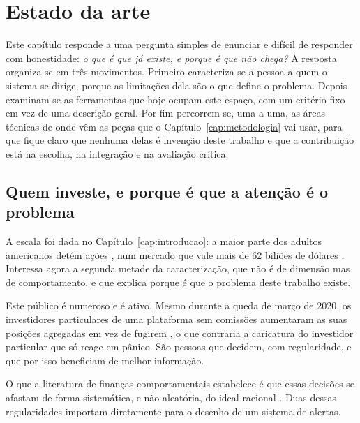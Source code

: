 
\chapter{Estado da arte}
\label{cap:contexto}

Este capítulo responde a uma pergunta simples de enunciar e difícil de responder com honestidade:
\emph{o que é que já existe, e porque é que não chega?} A resposta organiza-se em três movimentos.
Primeiro caracteriza-se a pessoa a quem o sistema se dirige, porque as limitações dela são o que
define o problema. Depois examinam-se as ferramentas que hoje ocupam este espaço, com um critério
fixo em vez de uma descrição geral. Por fim percorrem-se, uma a uma, as áreas técnicas de onde vêm
as peças que o Capítulo~\ref{cap:metodologia} vai usar, para que fique claro que nenhuma delas é
invenção deste trabalho e que a contribuição está na escolha, na integração e na avaliação crítica.

\section{Quem investe, e porque é que a atenção é o problema}
\label{sec:ctx_investidor}

A escala foi dada no Capítulo~\ref{cap:introducao}: a maior parte dos adultos americanos detém
ações \autocite{gallup2025stock}, num mercado que vale mais de 62 biliões de dólares
\autocite{sifma2025factbook}. Interessa agora a segunda metade da caracterização, que não é de
dimensão mas de comportamento, e que explica porque é que o problema deste trabalho existe.

Este público é numeroso e é ativo. Mesmo durante a queda de março de 2020, os investidores
particulares de uma plataforma sem comissões aumentaram as suas posições agregadas em vez de fugirem
\autocite{welch2022robinhood}, o que contraria a caricatura do investidor particular que só reage em
pânico. São pessoas que decidem, com regularidade, e que por isso beneficiam de melhor informação.

O que a literatura de finanças comportamentais estabelece é que essas decisões se afastam de forma
sistemática, e não aleatória, do ideal racional \autocite{barberis2003behavioral}. Duas dessas
regularidades importam diretamente para o desenho de um sistema de alertas.

